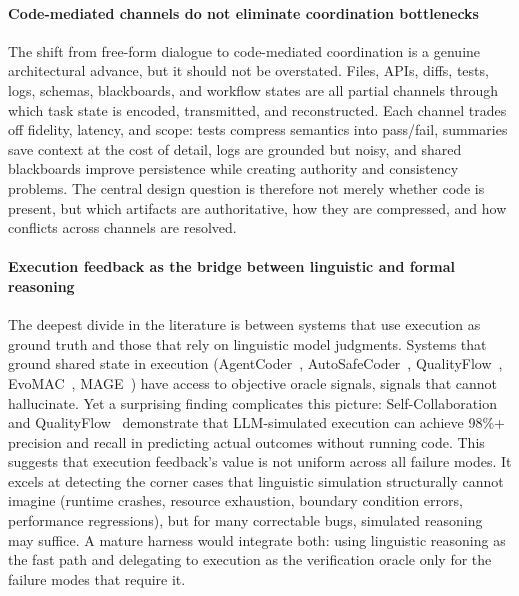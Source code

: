 \paragraph{Code-mediated channels do not eliminate coordination bottlenecks}
{The shift from free-form dialogue to code-mediated
coordination is a genuine architectural advance, but it should
not be overstated. Files, APIs, diffs, tests, logs, schemas,
blackboards, and workflow states are all partial channels
through which task state is encoded, transmitted, and
reconstructed. Each channel trades off fidelity, latency, and
scope: tests compress semantics into pass/fail, summaries save
context at the cost of detail, logs are grounded but noisy, and
shared blackboards improve persistence while creating authority
and consistency problems. The central design question is
therefore not merely whether code is present, but which
artifacts are authoritative, how they are compressed, and how
conflicts across channels are resolved.}

\paragraph{Execution feedback as the bridge between linguistic and formal reasoning}
The deepest divide in the literature is between systems that use
execution as ground truth and those that rely on linguistic model
judgments. Systems that ground shared state in execution
(AgentCoder~\cite{huang2023agentcoder},
AutoSafeCoder~\cite{Nunez2024AutoSafeCoder},
QualityFlow~\cite{Hu2025QualityFlow}, EvoMAC~\cite{Hu2025EvoMAC},
MAGE~\cite{Zhao2024MAGE}) have access to objective oracle
signals, signals that cannot hallucinate. Yet a surprising
finding complicates this picture:
Self-Collaboration~\cite{Dong2024SelfCollaboration} and
QualityFlow~\cite{Hu2025QualityFlow} demonstrate that
LLM-simulated execution can achieve 98\%+ precision and recall in
predicting actual outcomes without running code. This suggests
that execution feedback's value is not uniform across all failure
modes. It excels at detecting the corner cases that linguistic
simulation structurally cannot imagine (runtime crashes, resource
exhaustion, boundary condition errors, performance regressions),
but for many correctable bugs, simulated reasoning may suffice. A
mature harness would integrate both: using linguistic reasoning
as the fast path and delegating to execution as the verification
oracle only for the failure modes that require it.

